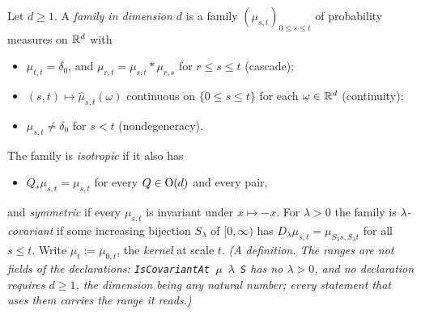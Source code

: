 \begin{definition}
\label{def:family-dimension-d}
\leanok
{}
Let $d \ge 1$. A \emph{family in dimension $d$} is a family $(\mu_{s,t})_{0 \le s \le t}$ of
probability measures on $\mathbb{R}^d$ with
\begin{itemize}
\item[(I1)] $\mu_{t,t} = \delta_0$, and $\mu_{r,t} = \mu_{s,t} * \mu_{r,s}$ for $r \le s \le t$
(cascade);
\item[(I2)] $(s,t) \mapsto \widehat\mu_{s,t}(\omega)$ continuous on $\{0 \le s \le t\}$ for each
$\omega \in \mathbb{R}^d$ (continuity);
\item[(ND)] $\mu_{s,t} \ne \delta_0$ for $s < t$ (nondegeneracy).
\end{itemize}
The family is \emph{isotropic} if it also has
\begin{itemize}
\item[(I3)] $Q_*\mu_{s,t} = \mu_{s,t}$ for every $Q \in \mathrm{O}(d)$ and every pair,
\end{itemize}
and \emph{symmetric} if every $\mu_{s,t}$ is invariant under $x \mapsto -x$. For $\lambda > 0$ the
family is \emph{$\lambda$-covariant} if some increasing bijection $S_\lambda$ of $[0,\infty)$ has
$D_\lambda\mu_{s,t} = \mu_{S_\lambda s, S_\lambda t}$ for all $s \le t$. Write
$\mu_t := \mu_{0,t}$, the \emph{kernel} at scale $t$.
\statusT\quad\emph{(A definition. The ranges are not fields of the declarations:
\texttt{IsCovariantAt $\mu$ $\lambda$ S} has no $\lambda > 0$, and no declaration requires $d \ge 1$, the
dimension being any natural number; every statement that uses them carries the range it reads.)}
\end{definition}

